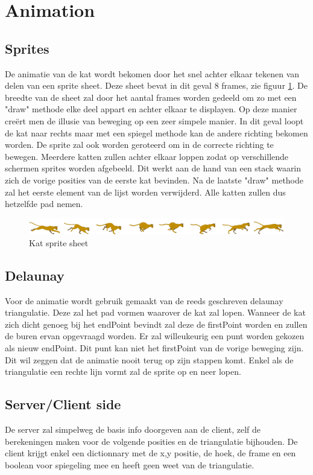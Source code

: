 \section{Animation}


\subsection{Sprites}

De animatie van de kat wordt bekomen door het snel achter elkaar tekenen van delen van een sprite sheet. Deze sheet bevat in dit geval 8 frames, zie figuur \ref{fig:cat}. De breedte van de sheet zal door het aantal frames worden gedeeld om zo met een "draw" methode elke deel appart en achter elkaar te displayen. Op deze manier creërt men de illusie van beweging op een zeer simpele manier. In dit geval loopt de kat naar rechts maar met een spiegel methode kan de andere richting bekomen worden. De sprite zal ook worden geroteerd om in de correcte richting te bewegen. Meerdere katten zullen achter elkaar loppen zodat op verschillende schermen sprites worden afgebeeld. Dit werkt aan de hand van een stack waarin zich de vorige posities van de eerste kat bevinden. Na de laatste "draw" methode zal het eerste element van de lijst worden verwijderd. Alle katten zullen dus hetzelfde pad nemen.

\begin{figure}[h]
\centering
\includegraphics[scale=0.2]{img/cat2.png}
\caption{Kat sprite sheet \cite{catsprite}}
\label{fig:cat}
\end{figure}




\subsection{Delaunay}

Voor de animatie wordt gebruik gemaakt van de reeds geschreven delaunay triangulatie. Deze zal het pad vormen waarover de kat zal lopen. Wanneer de kat zich dicht genoeg bij het endPoint bevindt zal deze de firstPoint worden en zullen de buren ervan opgevraagd worden. Er zal willeukeurig een punt worden gekozen als nieuw endPoint. Dit punt kan niet het firstPoint van de vorige beweging zijn. Dit wil zeggen dat de animatie nooit terug op zijn stappen komt. Enkel als de triangulatie een rechte lijn vormt zal de sprite op en neer lopen. 

\subsection{Server/Client side}

De server zal simpelweg de basis info doorgeven aan de client, zelf de berekeningen maken voor de volgende posities en de triangulatie bijhouden. De client krijgt enkel een dictionnary met de x,y positie, de hoek, de frame en een boolean voor spiegeling mee en heeft geen weet van de triangulatie.

